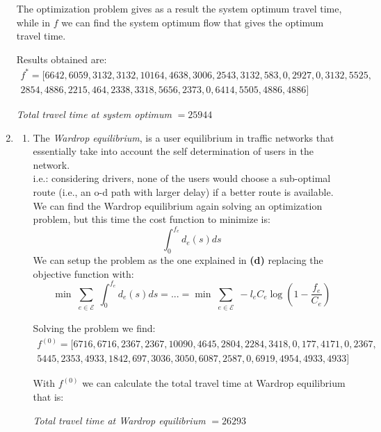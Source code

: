\documentclass[
	12pt, %
]{fphw}
\begin{document}
\begin{enumerate}[{\bfseries (a)}]
    The optimization problem gives as a result the system optimum travel time, while in $f$ we can find the system optimum flow that gives the optimum travel time. 
    
    Results obtained are:
    \begin{multline*}
        f^* = [6642,  6059,  3132,  3132, 10164,  4638,  3006,  2543,  3132,   583,     0,  2927, 0,  3132,  5525,\\  2854,  4886,  2215,   464,  2338,  3318,  5656,  2373,     0, 6414,  5505,  4886,  4886]
    \end{multline*}
    \begin{center}
        \emph{Total travel time at system optimum} $= 25944$
    \end{center}
    
    \item
    \begin{enumerate}[1.]
        \item The \emph{Wardrop equilibrium}, is a user equilibrium in traffic networks that essentially take into account the self determination of users in the network.\\
        i.e.: considering drivers, none of the users would choose a sub-optimal route (i.e., an o-d path with larger delay) if a better route is available.\\
        
        We can find the Wardrop equilibrium again solving an optimization problem, but this time the cost function to minimize is:
        \begin{equation}\label{eq:Wardrop1}
            \int_0^{f_e}d_e(s)ds
        \end{equation}
        We can setup the problem as the one explained in \textbf{(d)} replacing the objective function with: 
        $$
            \min \sum_{\substack{e \in \mathcal{E}}}\int_0^{f_e}d_e(s)ds
            = ... =\min \sum_{\substack{e \in \mathcal{E}}}-l_eC_e\log\left(1-\frac{f_e}{C_e}\right)
        $$
        
        Solving the problem we find:
        \begin{multline*}
            f^{(0)} = [6716,  6716,  2367,  2367, 10090,  4645,  2804,  2284,  3418,     0,   177,  4171,     0,  2367,\\  5445,  2353,  4933,  1842,   697,  3036,  3050,  6087,  2587,     0,  6919,  4954,  4933,  4933]
        \end{multline*}
        
        With $f^{(0)}$ we can calculate the total travel time at Wardrop equilibrium that is:
        \begin{center}
            \emph{Total travel time at Wardrop equilibrium} $= 26293$
        \end{center}
    

\end{enumerate}
\end{enumerate}
\end{document}
